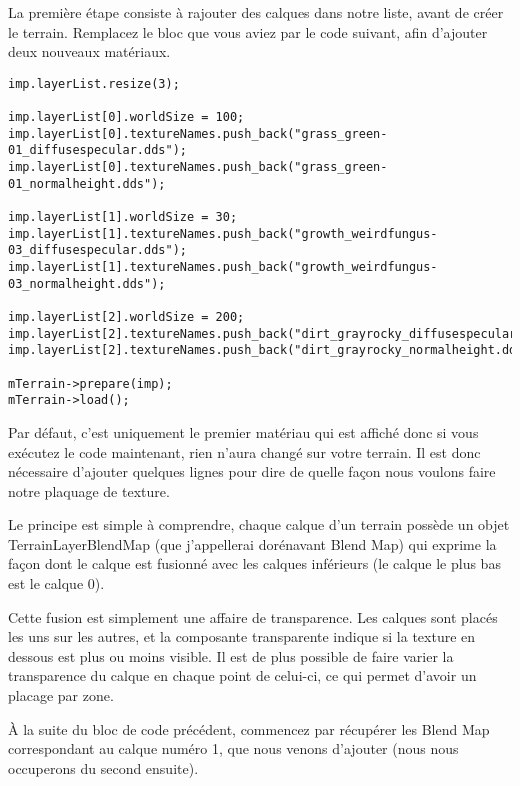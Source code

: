 \documentclass[10pt,a4paper]{report}
\begin{document}
La premi\`ere \'etape consiste \`a rajouter des calques dans notre liste, avant de cr\'eer le terrain. Remplacez le bloc que vous aviez par le code suivant, afin d'ajouter deux nouveaux mat\'eriaux.



\begin{lstlisting}[caption={Ajout de calques}]
imp.layerList.resize(3);

imp.layerList[0].worldSize = 100;
imp.layerList[0].textureNames.push_back("grass_green-01_diffusespecular.dds");
imp.layerList[0].textureNames.push_back("grass_green-01_normalheight.dds");

imp.layerList[1].worldSize = 30;
imp.layerList[1].textureNames.push_back("growth_weirdfungus-03_diffusespecular.dds");
imp.layerList[1].textureNames.push_back("growth_weirdfungus-03_normalheight.dds");

imp.layerList[2].worldSize = 200;
imp.layerList[2].textureNames.push_back("dirt_grayrocky_diffusespecular.dds");
imp.layerList[2].textureNames.push_back("dirt_grayrocky_normalheight.dds");

mTerrain->prepare(imp);
mTerrain->load();
\end{lstlisting}

Par d\'efaut, c'est uniquement le premier mat\'eriau qui est affich\'e donc si vous ex\'ecutez le code maintenant, rien n'aura chang\'e sur votre terrain.  Il est donc n\'ecessaire d'ajouter quelques lignes pour dire de quelle fa\c{c}on nous voulons faire notre plaquage de texture.\newline

Le principe est simple \`a comprendre, chaque calque d'un terrain poss\`ede un objet TerrainLayerBlendMap (que j'appellerai dor\'enavant Blend Map) qui exprime la fa\c{c}on dont le calque est fusionn\'e avec les calques inf\'erieurs (le calque le plus bas est le calque 0).

Cette fusion est simplement une affaire de transparence. Les calques sont plac\'es les uns sur les autres, et la composante transparente indique si la texture en dessous est plus ou moins visible. Il est de plus possible de faire varier la transparence du calque en chaque point de celui-ci, ce qui permet d'avoir un placage par zone.\newline

\`A la suite du bloc de code pr\'ec\'edent, commencez par r\'ecup\'erer les Blend Map correspondant au calque num\'ero 1, que nous venons d'ajouter (nous nous occuperons du second ensuite).
\end{document}
